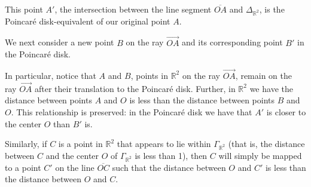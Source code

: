 \documentclass[12pt]{article}
\newcommand{\R}{\mathbb{R}}
\newcommand{\poincare}{Poincar\'{e} }
\theoremstyle{plain}
\theoremstyle{definition}
\begin{document}
\begin{appendices}
\begin{center}
\end{center}

This point $A'$, the intersection between the line segment $\overline{OA}$ and $\Delta_{\R^2}$, is the \poincare disk-equivalent of our original point $A$.

We next consider a new point $B$ on the ray $\overrightarrow{OA}$ and its corresponding point $B'$ in the \poincare disk. 

\begin{center}
\end{center}

In particular, notice that $A$ and $B$, points in $\R^2$ on the ray $\overrightarrow{OA}$, remain on the ray $\overrightarrow{OA}$ after their translation to the \poincare disk. Further, in $\R^2$ we have the distance between points $A$ and $O$ is less than the distance between points $B$ and $O$. This relationship is preserved: in the \poincare disk we have that $A'$ is closer to the center $O$ than $B'$ is.

Similarly, if $C$ is a point in $\R^2$ that appears to lie within $\Gamma_{\R^2}$ (that is, the distance between $C$ and the center $O$ of $\Gamma_{\R^2}$ is less than 1), then $C$ will simply be mapped to a point $C'$ on the line $\overline{OC}$ such that the distance between $O$ and $C'$ is less than the distance between $O$ and $C$. 


\end{appendices}
\end{document}
